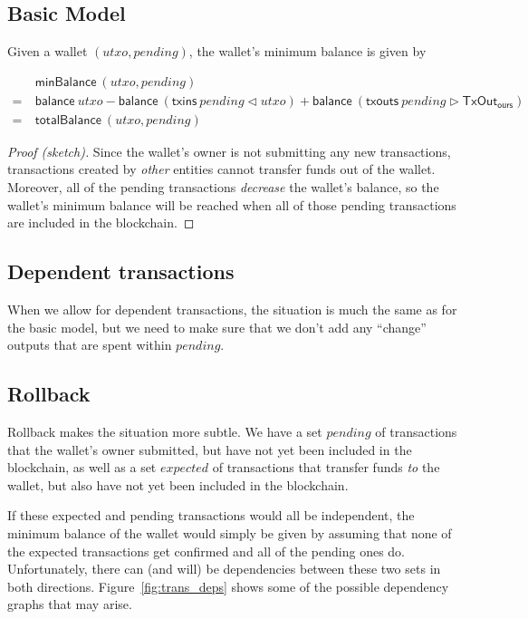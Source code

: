 \documentclass{article}
\newcommand{\restrictdom}{\lhd}
\newcommand{\restrictrange}{\rhd}
\begin{document}
\subsection{Basic Model}

Given a wallet $(\mathit{utxo}, \mathit{pending})$, the wallet's minimum balance
is given by

\begin{align*}
  & ~ \mathsf{minBalance} ~ (\mathit{utxo}, \mathit{pending}) \\
= & ~ \mathsf{balance} ~ \mathit{utxo}
    - \mathsf{balance} ~ (\mathsf{txins} ~ \mathit{pending} \restrictdom \mathit{utxo})
    + \mathsf{balance} ~ (\mathsf{txouts} ~ \mathit{pending} \restrictrange \mathsf{TxOut}_\mathsf{ours}) \\
= & ~ \mathsf{totalBalance} ~ (\mathit{utxo}, \mathit{pending})
\end{align*}

\begin{proof}[Proof (sketch)]
Since the wallet's owner is not submitting any new transactions, transactions
created by \emph{other} entities cannot transfer funds out of the wallet.
Moreover, all of the pending transactions \emph{decrease} the
wallet's balance, so the wallet's minimum balance will be reached when all
of those pending transactions are included in the blockchain.
\end{proof}

\subsection{Dependent transactions}

When we allow for dependent transactions, the situation is much the same as
for the basic model, but we need to make sure that we don't add any ``change''
outputs that are spent within $\mathit{pending}$.

\subsection{Rollback}

Rollback makes the situation more subtle. We have a set $\mathit{pending}$
of transactions that the wallet's owner submitted, but have not yet been
included in the blockchain, as well as a set $\mathit{expected}$ of transactions
that transfer funds \emph{to} the wallet, but also have not yet been included
in the blockchain.

If these expected and pending transactions would all be independent, the
minimum balance of the wallet would simply be given by assuming that none of
the expected transactions get confirmed and all of the pending ones do.
Unfortunately, there can (and will) be dependencies between these two sets
in both directions. Figure~\ref{fig:trans_deps} shows some of the possible
dependency graphs that may arise.
\end{document}
